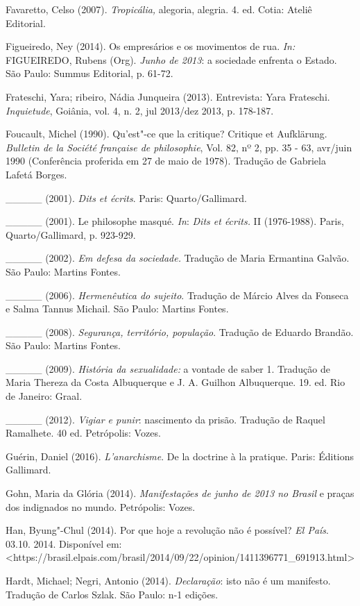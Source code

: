 Favaretto, Celso (2007). \emph{Tropicália, }alegoria, alegria. 4. ed.
Cotia: Ateliê Editorial.

Figueiredo, Ney (2014). Os empresários e os movimentos de rua. \emph{In:
}FIGUEIREDO, Rubens (Org). \emph{Junho de 2013}: a sociedade enfrenta o
Estado. São Paulo: Summus Editorial, p. 61-72.

Frateschi, Yara; ribeiro, Nádia Junqueira (2013). Entrevista: Yara
Frateschi. \emph{Inquietude}, Goiânia, vol. 4, n. 2, jul 2013/dez 2013,
p. 178-187.

Foucault, Michel (1990). Qu'est"-ce que la critique? Critique et
Aufklärung. \emph{Bulletin de la Société française de philosophie}, Vol.
82, nº 2, pp. 35 - 63, avr/juin 1990 (Conferência proferida em 27 de
maio de 1978). Tradução de Gabriela Lafetá Borges.

\_\_\_\_\_ (2001). \emph{Dits et écrits}. Paris: Quarto/Gallimard.

\_\_\_\_\_ (2001). Le philosophe masqué. \emph{In}: \emph{Dits et
écrits. }II (1976-1988). Paris, Quarto/Gallimard, p. 923-929.

\_\_\_\_\_ (2002). \emph{Em defesa da sociedade.} Tradução de Maria
Ermantina Galvão. São Paulo: Martins Fontes.

\_\_\_\_\_ (2006). \emph{Hermenêutica do sujeito}. Tradução de Márcio
Alves da Fonseca e Salma Tannus Michail. São Paulo: Martins Fontes.

\_\_\_\_\_ (2008). \emph{Segurança, território, população}. Tradução de
Eduardo Brandão. São Paulo: Martins Fontes.

\_\_\_\_\_ (2009). \emph{História da sexualidade:} a vontade de saber 1.
Tradução de Maria Thereza da Costa Albuquerque e J. A. Guilhon
Albuquerque. 19. ed. Rio de Janeiro: Graal.

\_\_\_\_\_ (2012). \emph{Vigiar e punir}: nascimento da prisão. Tradução
de Raquel Ramalhete. 40 ed. Petrópolis: Vozes.

Guérin, Daniel (2016). \emph{L'anarchisme}. De la doctrine à la
pratique. Paris: Éditions Gallimard.

Gohn, Maria da Glória (2014). \emph{Manifestações de junho de 2013 no
Brasil} e praças dos indignados no mundo. Petrópolis: Vozes.

Han, Byung"-Chul (2014). Por que hoje a revolução não é possível?
\emph{El País}. 03.10. 2014. Disponível em:
\textless{}https://brasil.elpais.com/brasil/2014/09/22/opinion/1411396771\_691913.html\textgreater{}

Hardt, Michael; Negri, Antonio (2014). \emph{Declaração}: isto não é um
manifesto. Tradução de Carlos Szlak. São Paulo: n-1 edições.


